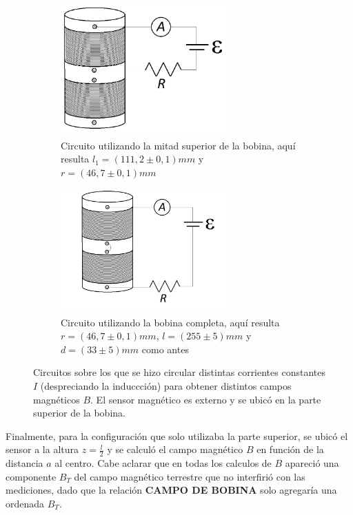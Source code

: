 \documentclass[11pt,a4paper]{article}
\begin{document}
\begin{figure}[h!]
   \begin{subfigure}{0.5\textwidth}
      \centering
      \includegraphics[width=0.7\textwidth]{Circuito_Bobina_corta}
      \caption{Circuito utilizando la mitad superior de la bobina, aquí resulta $l_1 = (111,2 \pm 0,1)mm$ y $r = (46,7 \pm 0,1)mm$}  
      \label{subfig:bob_corta}
   \end{subfigure}
   \begin{subfigure}{0.5\textwidth}
      \centering
      \includegraphics[width=0.7\textwidth]{Circuito_Bobina_larga}
      \caption{Circuito utilizando la bobina completa, aquí resulta $r = (46,7 \pm 0,1)mm$, $l = (255 \pm 5)mm$ y $d = (33 \pm 5)mm$ como antes}  
      \label{subfig:bob_larga}
   \end{subfigure}
   \caption{Circuitos sobre los que se hizo circular distintas corrientes constantes $I$ (despreciando la induccción) para obtener distintos campos magnéticos $B$. El sensor magnético es externo y se ubicó en la parte superior de la bobina.}
   \label{fig:circ_bob}
\end{figure}

Finalmente, para la configuración que solo utilizaba la parte superior, se ubicó el sensor a la altura $z = \frac{l}{2}$ y se calculó el campo magnético $B$ en función de la distancia $a$ al centro. Cabe aclarar que en todas los calculos de $B$ apareció una componente $B_{T}$ del campo magnético terrestre que no interfirió con las mediciones, dado que la relación \textbf{CAMPO DE BOBINA} solo agregaría una ordenada $B_T$.
\end{document}
